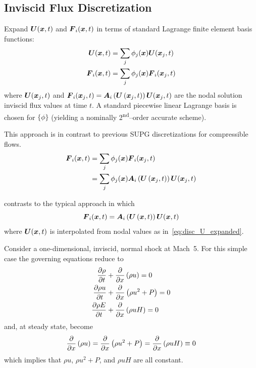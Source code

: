 \documentclass[compress,11pt]{beamer}
\begin{document}
\subsection{Inviscid Flux Discretization}
\frame
{
  \scriptsize
  Expand ${\boldsymbol{U}}({\boldsymbol{x}},t)$ and ${\boldsymbol{F}}_i({\boldsymbol{x}},t)$ in terms of standard Lagrange finite element basis functions:
  \begin{align}
    {\boldsymbol{U}}  ({\boldsymbol{x}},t) &= \sum_j \phi_j({\boldsymbol{x}}) {\boldsymbol{U}}({\boldsymbol{x}}_j,t)   \label{eq:disc_U_expanded} \\
    {\boldsymbol{F}}_i({\boldsymbol{x}},t) &= \sum_j \phi_j({\boldsymbol{x}}) {\boldsymbol{F}}_i({\boldsymbol{x}}_j,t) \label{eq:disc_F_expanded}
  \end{align}
  where ${\boldsymbol{U}}({\boldsymbol{x}}_j,t)$ and ${\boldsymbol{F}}_i({\boldsymbol{x}}_j,t)={\boldsymbol{A}}_i\left({\boldsymbol{U}}\left({\boldsymbol{x}}_j,t\right)\right){\boldsymbol{U}}({\boldsymbol{x}}_j,t)$ are the nodal solution inviscid flux values at time $t$. A standard piecewise linear Lagrange basis is chosen for $\{\phi\}$ (yielding a nominally 2\textsuperscript{nd}--order accurate scheme).

  {
    This approach is in contrast to previous SUPG discretizations for compressible flows.~\cite{gjlebeau_thesis,skaliabadi_dissertation,hauke_hughes_compressible_variables,catabriga_coutinho_SUPG_convergence}
    \begin{align}
      {\boldsymbol{F}}_i({\boldsymbol{x}},t) &= \sum_j \phi_j({\boldsymbol{x}}) {\boldsymbol{F}}_i({\boldsymbol{x}}_j,t) \nonumber \\
      &= \sum_j \phi_j({\boldsymbol{x}}) {\boldsymbol{A}}_i\left({\boldsymbol{U}}\left({\boldsymbol{x}}_j,t\right)\right){\boldsymbol{U}}({\boldsymbol{x}}_j,t) \label{eq:disc_F=AU_expanded}
    \end{align}
  }
  
  {
    contrasts to the typical approach in which
    \begin{equation}
      {\boldsymbol{F}}_i({\boldsymbol{x}},t) = {\boldsymbol{A}}_i\left({\boldsymbol{U}}\left({\boldsymbol{x}},t\right)\right){\boldsymbol{U}}({\boldsymbol{x}},t) \label{eq:disc_F=AU_expanded_standard}
    \end{equation}
    where ${\boldsymbol{U}}({\boldsymbol{x}},t)$ is interpolated from nodal values as in~\eqref{eq:disc_U_expanded}.
  }
}

\frame
{
  \small
  Consider a one-dimensional, inviscid, normal shock at Mach~5.  For this simple case the governing equations reduce to
  \begin{align*}
    {\frac{\partial{\rho}}{\partial{t}}} &+ {\frac{\partial{}}{\partial{x}}} \left(\rho u\right) = 0 \\
    {\frac{\partial{\rho u}}{\partial{t}}} &+ {\frac{\partial{}}{\partial{x}}}\left(\rho u^2 + P\right) = 0 \\
    {\frac{\partial{\rho E}}{\partial{t}}} &+ {\frac{\partial{}}{\partial{x}}} \left(\rho u H\right) = 0
  \end{align*}
  and, at steady state, become
  \begin{equation}
    {\frac{\partial{}}{\partial{x}}} \left(\rho u\right) = {\frac{\partial{}}{\partial{x}}} \left(\rho u^2 + P\right) = {\frac{\partial{}}{\partial{x}}} \left(\rho u H\right) \equiv 0 \label{eq:1d_steady_NS}
  \end{equation}
  which implies that $\rho u$, $\rho u^2+P$, and $\rho u H$ are all constant.
}
\end{document}
